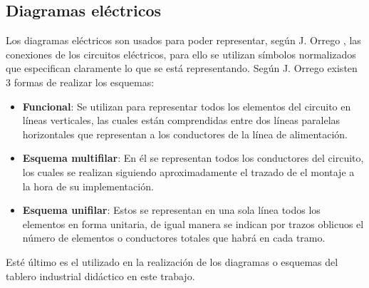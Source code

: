 \subsection*{Diagramas eléctricos}
Los diagramas eléctricos son usados para poder representar, según J. Orrego \cite{orrego2007electricidad}, las conexiones de los circuitos eléctricos, para ello se utilizan símbolos normalizados que especifican claramente lo que se está representando. Según J. Orrego \cite{orrego2007electricidad} existen 3 formas de realizar los esquemas:

 \begin{itemize}
  \item \textbf{Funcional}: Se utilizan para representar todos los elementos del circuito en líneas verticales, las cuales están comprendidas entre dos líneas paralelas horizontales que representan a los conductores de la línea de alimentación.
  \item \textbf{Esquema multifilar}: En él se representan todos los conductores del circuito, los cuales se realizan siguiendo aproximadamente el trazado de el montaje a la hora de su implementación.
  \item \textbf{Esquema unifilar}: Estos se representan en una sola línea todos los elementos en forma unitaria, de igual manera se indican por trazos oblicuos el número de elementos o conductores totales que habrá en cada tramo. 
  \end{itemize}

Esté último es el utilizado en la realización de los diagramas o esquemas del tablero industrial didáctico en este trabajo.

